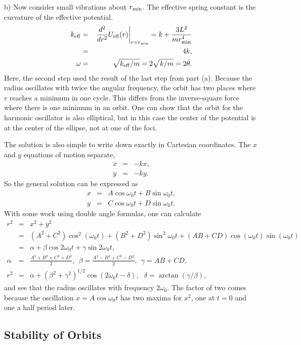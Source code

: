 b) Now consider small vibrations about $r_{\rm min}$. The effective spring constant is the curvature of the effective potential.
\begin{eqnarray*}
k_{\rm eff}&=&\left.\frac{d^2}{dr^2}U_{\rm eff}(r)\right|_{r=r_{\rm min}}=k+\frac{3L^2}{mr_{\rm min}^4}\\
&=&4k,\\
\omega&=&\sqrt{k_{\rm eff}/m}=2\sqrt{k/m}=2\dot{\theta}.
\end{eqnarray*}
Here, the second step used the result of the last step from part (a). Because the radius oscillates with twice the angular frequency, the orbit has two places where $r$ reaches a minimum in one cycle. This differs from the inverse-square force where there is one minimum in an orbit. One can show that the orbit for the harmonic oscillator is also elliptical, but in this case the center of the potential is at the center of the ellipse, not at one of the foci.

The solution is also simple to write down exactly in Cartesian coordinates. The $x$ and $y$ equations of motion separate,
\begin{eqnarray*}
\ddot{x}&=&-kx,\\
\ddot{y}&=&-ky.
\end{eqnarray*}
So the general solution can be expressed as
\begin{eqnarray*}
x&=&A\cos\omega_0 t+B\sin\omega_0 t,\\
y&=&C\cos\omega_0 t+D\sin\omega_0 t.
\end{eqnarray*}
With some work using double angle formulas, one can calculate
\begin{eqnarray*}
r^2&=&x^2+y^2\\
\nonumber
&=&(A^2+C^2)\cos^2(\omega_0t)+(B^2+D^2)\sin^2\omega_0t+(AB+CD)\cos(\omega_0t)\sin(\omega_0t)\\
\nonumber
&=&\alpha+\beta\cos 2\omega_0 t+\gamma\sin 2\omega_0 t,\\
\alpha&=&\frac{A^2+B^2+C^2+D^2}{2},~~\beta=\frac{A^2-B^2+C^2-D^2}{2},~~\gamma=AB+CD,\\
r^2&=&\alpha+(\beta^2+\gamma^2)^{1/2}\cos(2\omega_0 t-\delta),~~~\delta=\arctan(\gamma/\beta),
\end{eqnarray*}
and see that the radius oscillates with frequency $2\omega_0$. The factor of two comes because the oscillation $x=A\cos\omega_0t$ has two maxima for $x^2$, one at $t=0$ and one a half period later.

\exampleend

\subsection{Stability of Orbits}

